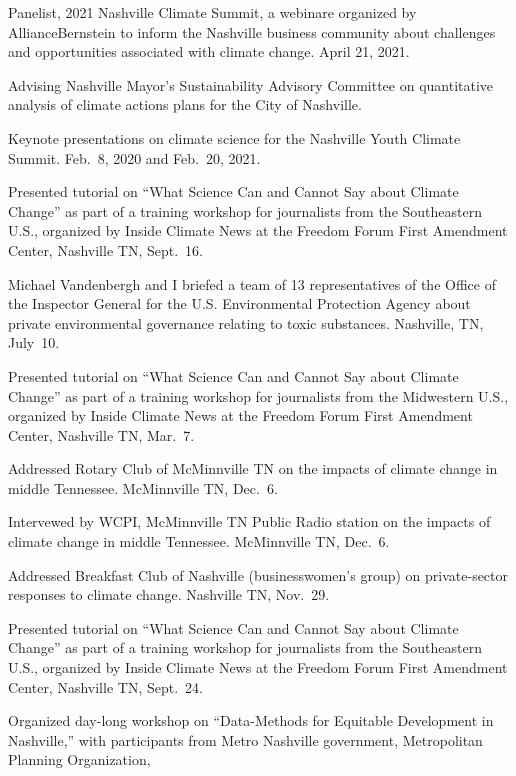 \item[2021] Panelist, 2021 Nashville Climate Summit, a webinare organized by
 AllianceBernstein to inform the Nashville business community about
 challenges and opportunities associated with climate change. April 21, 2021.
\item[2020--present] Advising Nashville Mayor's Sustainability Advisory Committee on quantitative analysis of climate actions plans for the City of Nashville.
\item[2020--2021] Keynote presentations on climate science for the Nashville
  Youth Climate Summit. Feb.~8, 2020 and Feb.~20, 2021.
\item[2019] Presented tutorial on ``What Science Can and Cannot Say about Climate Change'' as part of a training workshop for journalists from the Southeastern U.S., organized by Inside Climate News at the Freedom Forum First Amendment Center, Nashville TN, Sept.~16.
\item[2019] Michael Vandenbergh and I briefed a team of 13 representatives of the Office of the Inspector General for the U.S. Environmental Protection Agency about private environmental governance relating to toxic substances. Nashville, TN, July~10.
\item[2019] Presented tutorial on ``What Science Can and Cannot Say about Climate Change'' as part of a training workshop for journalists from the Midwestern U.S., organized by Inside Climate News at the Freedom Forum First Amendment Center, Nashville TN, Mar.~7.
\item[2018] Addressed Rotary Club of McMinnville TN on the impacts of climate change in middle Tennessee. McMinnville TN, Dec.\ 6.
\item[2018] Intervewed by WCPI, McMinnville TN Public Radio station on the impacts of climate change in middle Tennessee. McMinnville TN, Dec.\ 6.
\item[2018] Addressed Breakfast Club of Nashville (businesswomen's group) on private-sector responses to climate change. Nashville TN, Nov.\ 29.
\item[2018] Presented tutorial on ``What Science Can and Cannot Say about Climate Change'' as part of a training workshop for journalists from the Southeastern U.S., organized by Inside Climate News at the Freedom Forum First Amendment Center, Nashville TN, Sept.~24.
\item[2018] Organized day-long workshop on ``Data-Methods for Equitable Development in Nashville,'' with participants from Metro Nashville government, Metropolitan Planning Organization,
